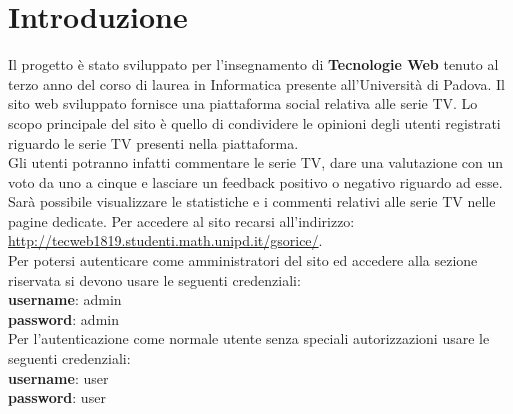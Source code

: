 \newpage
\section{Introduzione}
Il progetto è stato sviluppato per l'insegnamento di \textbf{\normalsize{Tecnologie Web}} tenuto al terzo anno del corso di laurea in Informatica presente all'Università di Padova. Il sito web sviluppato fornisce una piattaforma social relativa alle serie TV. Lo scopo principale del sito è quello di condividere le opinioni degli utenti registrati riguardo le serie TV presenti nella piattaforma.\\
Gli utenti potranno infatti commentare le serie TV, dare una valutazione con un voto da uno a cinque e lasciare un feedback positivo o negativo riguardo ad esse.\\
Sarà possibile visualizzare le statistiche e i commenti relativi alle serie TV nelle pagine dedicate.
Per accedere al sito recarsi all'indirizzo: \url{http://tecweb1819.studenti.math.unipd.it/gsorice/}.~\\

Per potersi autenticare come amministratori del sito ed accedere 
alla sezione riservata si devono usare le seguenti credenziali: \\
\enspace \textbf{username}: admin\\ 
\enspace \textbf{password}: admin \\

Per l'autenticazione come normale utente senza speciali autorizzazioni usare le seguenti credenziali:\\
\enspace \textbf{username}: user\\ 
\enspace \textbf{password}: user \\
